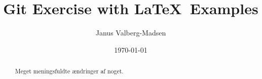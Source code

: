 \documentclass[11pt,a4paper]{article}
\title{Git Exercise with \LaTeX\ Examples}
\author{Janus Valberg-Madsen}
\date{\today}
\begin{document}
\maketitle

\begin{abstract}
  
  
Meget meningsfuldte ændringer af noget.

\end{abstract}

\tableofcontents



\end{document}
